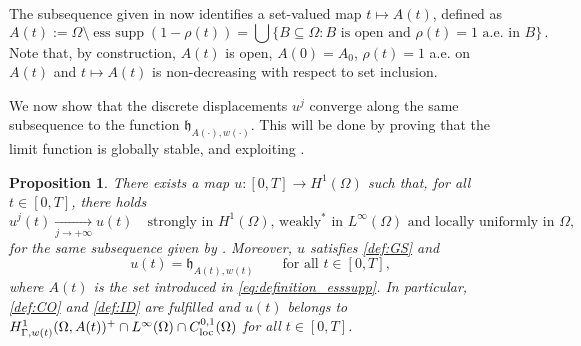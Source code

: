 \documentclass[a4paper,11pt,reqno]{amsart}
\numberwithin{equation}{section}
\newtheorem{prop}[teo]{Proposition}
\theoremstyle{definition}
\theoremstyle{remark}
\begin{document}
The subsequence given in  now identifies a set-valued map $t \mapsto A(t)$, defined as
\begin{equation}\label{eq:definition_esssupp}
        A(t) := \Omega\setminus \operatorname{ess\ supp} (1-\rho(t))=\bigcup\{B \subseteq \Omega \colon B \text{ is open and } \rho(t) = 1 \text{ a.e. in } B\}\,.
\end{equation}
Note that, by construction, $A(t)$ is open, $A(0)=A_0$, $\rho(t) = 1$ a.e. on $A(t)$ and $t \mapsto A(t)$ is non-decreasing with respect to set inclusion.

We now show that the discrete displacements $u^j$ converge along the same subsequence to the function $\mathfrak{h}_{A(\cdot),w(\cdot)}$.
This will be done by proving that the limit function is globally stable, and exploiting .

\begin{prop}\label{teo:convergence_u}
    There exists a map $u\colon[0,T]\to H^1(\Omega)$ such that, for all $t\in [0,T]$, there holds
    \begin{equation}\label{eq:convergence}
        u^{j}(t) \xrightarrow[j\to +\infty]{} u(t) \quad \text{strongly in $H^1(\Omega)$, weakly$^*$ in $L^\infty(\Omega)$ and locally uniformly in $\Omega$,}
    \end{equation} 
    for the same subsequence given by . Moreover, $u$ satisfies \ref{def:GS} and
    \begin{equation}\label{eq:u=uA}
        u(t)=\mathfrak{h}_{A(t),w(t)}\qquad\text{for all }t\in [0,T],
    \end{equation}
    where $A(t)$ is the set introduced in \eqref{eq:definition_esssupp}. In particular, \ref{def:CO} and \ref{def:ID} are fulfilled and $u(t)$ belongs to $H^1_{\Gamma,w(t)}(\Omega, A(t))^+\cap L^\infty(\Omega)\cap C^{0,1}_{\rm loc}(\Omega)$ for all $t\in [0,T]$. 
\end{prop}
\end{document}

